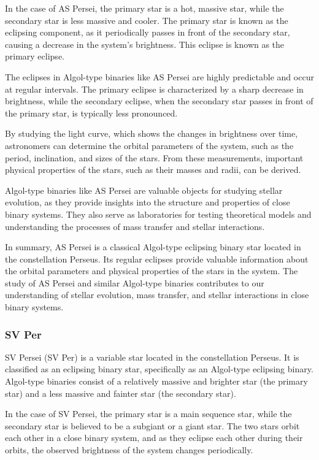 In the case of AS Persei, the primary star is a hot, massive star, while the secondary star is less massive and cooler. The primary star is known as the eclipsing component, as it periodically passes in front of the secondary star, causing a decrease in the system's brightness. This eclipse is known as the primary eclipse.

The eclipses in Algol-type binaries like AS Persei are highly predictable and occur at regular intervals. The primary eclipse is characterized by a sharp decrease in brightness, while the secondary eclipse, when the secondary star passes in front of the primary star, is typically less pronounced.

By studying the light curve, which shows the changes in brightness over time, astronomers can determine the orbital parameters of the system, such as the period, inclination, and sizes of the stars. From these measurements, important physical properties of the stars, such as their masses and radii, can be derived.

Algol-type binaries like AS Persei are valuable objects for studying stellar evolution, as they provide insights into the structure and properties of close binary systems. They also serve as laboratories for testing theoretical models and understanding the processes of mass transfer and stellar interactions.

In summary, AS Persei is a classical Algol-type eclipsing binary star located in the constellation Perseus. Its regular eclipses provide valuable information about the orbital parameters and physical properties of the stars in the system. The study of AS Persei and similar Algol-type binaries contributes to our understanding of stellar evolution, mass transfer, and stellar interactions in close binary systems.


\subsubsection*{ SV Per }
SV Persei (SV Per) is a variable star located in the constellation Perseus. It is classified as an eclipsing binary star, specifically as an Algol-type eclipsing binary. Algol-type binaries consist of a relatively massive and brighter star (the primary star) and a less massive and fainter star (the secondary star).

In the case of SV Persei, the primary star is a main sequence star, while the secondary star is believed to be a subgiant or a giant star. The two stars orbit each other in a close binary system, and as they eclipse each other during their orbits, the observed brightness of the system changes periodically.

